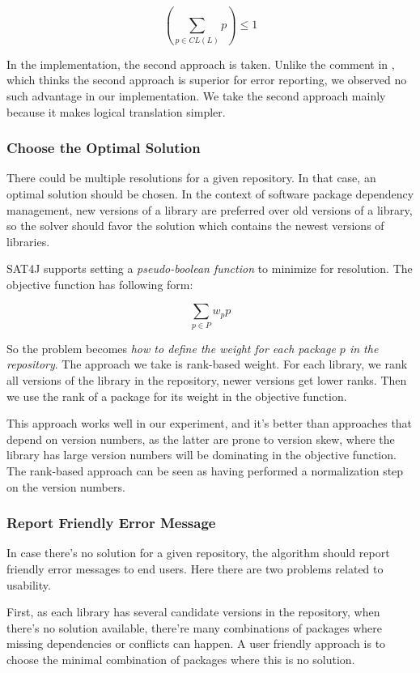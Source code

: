 \[
(\sum_{p \in CL(L)} p) \leq 1
\]

In the implementation, the second approach is taken. Unlike the comment in \cite{berre2009dependency}, which thinks the second approach is superior for error reporting, we observed no such advantage in our implementation. We take the second approach mainly because it makes logical translation simpler.

\subsubsection{Choose the Optimal Solution}

There could be multiple resolutions for a given repository. In that case, an optimal solution should be chosen. In the context of software package dependency management, new versions of a library are preferred over old versions of a library, so the solver should favor the solution which contains the newest versions of libraries.

SAT4J supports setting a \emph{pseudo-boolean function} to minimize for resolution. The objective function has following form:

\[
\sum_{p \in P} w_p p
\]

So the problem becomes \emph{how to define the weight for each package $p$ in the repository}. The approach we take is rank-based weight. For each library, we rank all versions of the library in the repository, newer versions get lower ranks. Then we use the rank of a package for its weight in the objective function.

This approach works well in our experiment, and it's better than approaches that depend on version numbers, as the latter are prone to version skew, where the library has large version numbers will be dominating in the objective function. The rank-based approach can be seen as having performed a normalization step on the version numbers.

\subsubsection{Report Friendly Error Message}

In case there's no solution for a given repository, the algorithm should report friendly error messages to end users. Here there are two problems related to usability.

First, as each library has several candidate versions in the repository, when there's no solution available, there're many combinations of packages where missing dependencies or conflicts can happen. A user friendly approach is to choose the minimal combination of packages where this is no solution.

